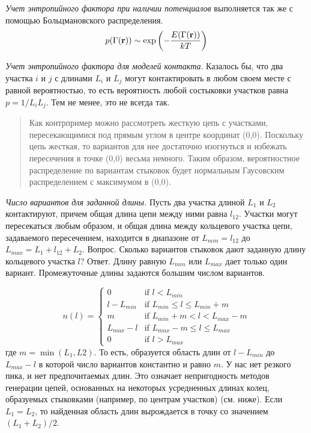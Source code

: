 \documentclass[tikz,a4paper]{scrartcl} %
\begin{document}
\textit{Учет энтропийного фактора при наличии потенциалов} выполняется так же с помощью Больцмановского распределения.
\[ p(\Gamma(\bold r)) \sim \exp\left(-\frac{E(\Gamma(\bold r))}{kT}\right)  \]

\textit{Учет энтропийного фактора для моделей контакта}. Казалось бы, что два участка $i$ и $j$ с длинами $L_i$ и $L_j$ могут контактировать в любом своем месте с равной вероятностью, то есть вероятность любой состыковки участков равна $p = 1 / L_i L_j$. Тем не менее, это не всегда так. 
\begin{quote} Как контрпример можно рассмотреть жесткую цепь с участками, пересекающимися под прямым углом в центре координат (0,0). Поскольку цепь жесткая, то вариантов для нее достаточно изогнуться и избежать пересечения в точке (0,0) весьма немного. Таким образом, вероятностное распределение по вариантам стыковок будет нормальным Гаусовским распределением с максимумом в (0,0).
\end{quote}

\textit{Число вариантов для заданной длины.} Пусть два участка длиной $L_1$ и $L_2$ контактируют, причем общая длина цепи между ними равна $l_{12}$. Участки могут пересекаться любым образом, и общая длина между кольцевого участка цепи, задаваемого пересечением, находится в диапазоне от $L_{min} = l_{12}$ до $L_{max} = L_1 + l_{12} + L_2$. Вопрос. Сколько вариантов стыковок дают заданную длину кольцевого участка $l$? Ответ. Длину равную $L_{min}$ или $L_{max}$ дает только один вариант. Промежуточные длины задаются большим числом вариантов. 

\[ n(l) = \begin{cases} 
0 			&\mbox{if } l < L_{min} \\ 
l - L_{min}	&\mbox{if } L_{min} \leq l \leq L_{min} + m \\ 
m			&\mbox{if } L_{min} + m < l < L_{max} - m \\ 
L_{max} - l 	&\mbox{if } L_{max} - m \leq l \leq L_{max}  \\
0 			&\mbox{if } l > L_{max} 
\end{cases} \]
где $m = \min(L_1, L2)$. То есть, образуется область длин от $l-L_{min}$ до $L_{max}-l$ в которой число вариантов константно и равно $m$. У нас нет резкого пика, и нет предпочитаемых длин. Это означает непригодность методов генерации цепей, основанных на некоторых усредненных длинах колец, образуемых стыковками (например, по центрам участков) (см. ниже). Если $L_1 = L_2$, то найденная область длин вырождается в точку со значением $(L_1 + L_2)/2$.
\end{document}
